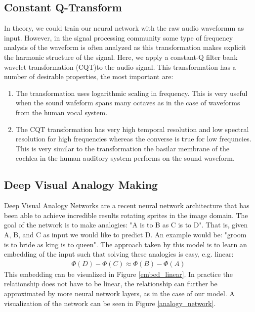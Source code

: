 \documentclass{article}
\begin{document}
\subsection{Constant Q-Transform}
    In theory, we could train our neural network with the raw audio waveformm as input. However, in the signal processing community some type of frequency analysis of the waveform is often analyzed as this transformation makes explicit the harmonic structure of the signal. Here, we apply a constant-Q filter bank wavelet transformation (CQT)to the audio signal. This transformation has a number of desirable properties, the most important are:
\begin{enumerate}
\item The transformation uses logarithmic scaling in frequency. This is very useful when the sound wafeform spans many octaves as in the case of waveforms from the human vocal system.
\item The CQT transformation has very high temporal resolution and low spectral resolution for high frequencies whereas the converse is true for low frequncies. This is very similar to the transformation the basilar membrane of the cochlea in the human auditory system performs on the sound waveform.
\end{enumerate}

\subsection{Deep Visual Analogy Making}
    Deep Visual Analogy Networks \cite{reed2015deep} are a recent neural network architecture that has been able to achieve incredible results rotating sprites in the image domain. The goal of the network is to make analogies: "A is to B as C is to D". That is, given A, B, and C as input we would like to predict D. An example would be: "groom is to bride as king is to queen". The approach taken by this model is to learn an embedding of the input such that solving these analogies is easy, e.g. linear:
\begin{eqnarray*}
\Phi(D) - \Phi(C) \approx \Phi(B) - \Phi(A)
\end{eqnarray*}
This embedding can be visualized in Figure \ref{embed_linear}. In practice the relationship does not have to be linear, the relationship can further be approximated by more neural network layers, as in the case of our model. A visualization of the network can be seen in Figure \ref{analogy_network}.
\end{document}
